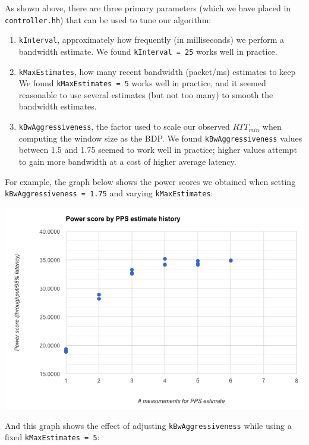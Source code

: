 \documentclass{article}
\begin{document}
As shown above, there are three primary parameters (which we have placed in \texttt{controller.hh}) that can be used to tune our algorithm:

\begin{enumerate}
    \item \texttt{kInterval}, approximately how frequently (in milliseconds) we perform a bandwidth estimate. We found \texttt{kInterval = 25} works well in practice.
    \item \texttt{kMaxEstimates}, how many recent bandwidth (packet/ms) estimates to keep We found \texttt{kMaxEstimates = 5} works well in practice, and it seemed reasonable to use several estimates (but not too many) to smooth the bandwidth estimates.
    \item \texttt{kBwAggressiveness}, the factor used to scale our observed $RTT_{min}$ when computing the window size as the BDP. We found \texttt{kBwAggressiveness} values between 1.5 and 1.75 seemed to work well in practice; higher values attempt to gain more bandwidth at a cost of higher average latency.
\end{enumerate}

For example, the graph below shows the power scores we obtained when setting \texttt{kBwAggressiveness = 1.75} and varying \texttt{kMaxEstimates}:

\begin{center}
\includegraphics[width=1.0\textwidth]{images/exercise_d_power_score.png}
\end{center}

And this graph shows the effect of adjusting \texttt{kBwAggressiveness} while using a fixed \texttt{kMaxEstimates = 5}:
\end{document}

